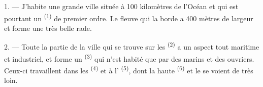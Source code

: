 %
%
%
%

\VUsaut{2.0mm}
\VUsaut{3.0mm}
\VUfilet{16mm}
\VUsaut{5.6mm}
\VUsaut{1.4mm}
\VUsaut{2.2mm}

\VUsaut{3.0mm}

1. --- J'habite une grande ville située à 100 kilomètres de l'Océan et qui est
pourtant un  \textsuperscript{(1)} de premier ordre. Le fleuve qui
la borde a 400 mètres de largeur et forme une très belle rade.

2. --- Toute la partie de la ville qui se trouve sur les 
\textsuperscript{(2)} a un aspect tout maritime et industriel, et forme un
 \textsuperscript{(3)} qui n'est habité que par des marins et
des ouvriers. Ceux-ci travaillent dans les 
\textsuperscript{(4)} et à l' \textsuperscript{(5)}, dont la
haute  \textsuperscript{(6)} et le  se voient
de très loin.

